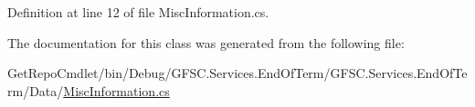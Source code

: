 Definition at line 12 of file Misc\+Information.\+cs.



The documentation for this class was generated from the following file\+:\begin{DoxyCompactItemize}
\item 
Get\+Repo\+Cmdlet/bin/\+Debug/\+G\+F\+S\+C.\+Services.\+End\+Of\+Term/\+G\+F\+S\+C.\+Services.\+End\+Of\+Term/\+Data/\mbox{\hyperlink{_data_2_misc_information_8cs}{Misc\+Information.\+cs}}\end{DoxyCompactItemize}
